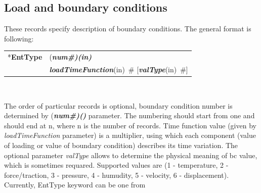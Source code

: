 \documentclass[a4paper]{article}
\makeatletter
\newcommand{\param}[1]{{\em #1}}
\newcommand{\fieldVal}[2]{\mbox{({\it\bf{#1}\#)\tiny (#2)}}}
\newcommand{\keywordnotype}[1]{\mbox{{\it{\bf{#1}}}}}
\newcommand{\keyword}[2]{\mbox{{\keywordnotype{#1}\tiny (#2)}}}
\newcommand{\entKeyword}[1]{\mbox{{*{\bf{#1}}}}}
\newcommand{\field}[2]{\mbox{\keyword{#1}{#2}~\#}}
\newcommand{\optField}[2]{\mbox{[\field{#1}{#2}]}}
\newenvironment{record}[1][]{\begin{tabular}{|ll}}{\end{tabular}\\}
\newcommand{\recentry}[2]{{#1}&{#2}\\}
\newcounter{rcc}
\newenvironment{record}[1][\textwidth]{\setcounter{rcc}{0}\begin{tabular*}{#1}{|ll@{\extracolsep{\fill}}r}}{\end{tabular*}\\}
\newcommand{\recentry}[2]{\ifthenelse{\value{rcc}>0}{&$\backslash$ \\}{\setcounter{rcc}{1}}{#1}&{#2}}
\makeatother
\begin{document}
\subsection{Load and boundary conditions}
\label{_LoadBoundaryInitialConditions}
These records specify description of  boundary conditions. The general format is
following:

\noindent
\begin{record}
  \recentry{\entKeyword{EntType}}{\fieldVal{num}{in}}
  \recentry{}{\field{loadTimeFunction}{in} \optField{valType}{in}}
\end{record}

The order of particular  records is optional, boundary condition number is determined by \fieldVal{num}{} parameter.
The numbering should start from one and should end at n, where n is the number of records.
Time function value (given by \param{loadTimeFunction} parameter) is a multiplier, using which
each  component (value of loading or value of boundary condition)
describes its time variation. 
The optional parameter \param{valType} allows to determine the
physical meaning of bc value, which is sometimes requared. Supported
values are (1 - temperature, 2 - force/traction,
3 - pressure, 4 - humudity, 5 - velocity, 6 - displacement). 
Currently, EntType keyword can be one from
\end{document}
